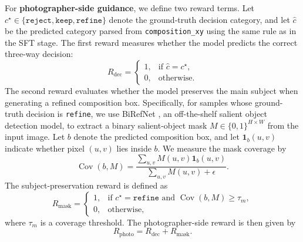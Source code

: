 \documentclass{article} %
\begin{document}
For \textbf{photographer-side guidance}, we define two reward terms. Let $c^\star \in \{\texttt{reject}, \texttt{keep}, \texttt{refine}\}$ denote the ground-truth decision category, and let $\hat{c}$ be the predicted category parsed from \texttt{composition\_xy} using the same rule as in the SFT stage. The first reward measures whether the model predicts the correct three-way decision:
\begin{equation}
R_{\text{dec}} =
\begin{cases}
1, & \text{if } \hat{c} = c^\star, \\
0, & \text{otherwise}.
\end{cases}
\end{equation}
The second reward evaluates whether the model preserves the main subject when generating a refined composition box. Specifically, for samples whose ground-truth decision is \texttt{refine}, we use BiRefNet \citep{zheng2024bilateral}, an off-the-shelf salient object detection model, to extract a binary salient-object mask $M \in \{0,1\}^{H \times W}$ from the input image. Let $b$ denote the predicted composition box, and let $\mathbf{1}_{b}(u,v)$ indicate whether pixel $(u,v)$ lies inside $b$. We measure the mask coverage by
\begin{equation}
\operatorname{Cov}(b,M) =
\frac{\sum_{u,v} M(u,v)\mathbf{1}_{b}(u,v)}
{\sum_{u,v} M(u,v) + \epsilon}.
\end{equation}
The subject-preservation reward is defined as
\begin{equation}
R_{\text{mask}} =
\begin{cases}
1, & \text{if } c^\star = \texttt{refine} \text{ and } \operatorname{Cov}(b,M) \ge \tau_m, \\
0, & \text{otherwise},
\end{cases}
\end{equation}
where $\tau_m$ is a coverage threshold. The photographer-side reward is then given by
\begin{equation}
R_{\text{photo}} = R_{\text{dec}} + R_{\text{mask}}.
\end{equation}
\end{document}
